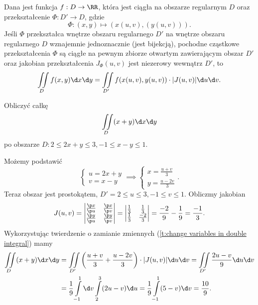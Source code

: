 \begin{theorem}
    \label{t:change variables in double integral}
    Dana jest funkcja $f : D \to \RR$, która jest ciągła na obszarze regularnym $D$ oraz przekształcenie $\varPhi : D' \to D$, gdzie
    \[ \varPhi : (x, y) \mapsto (x(u, v), (y(u, v))). \]
    Jeśli $\varPhi$ przekształca wnętrze obszaru regularnego $D'$ na wnętrze obszaru regularnego $D$ wznajemnie jednoznacznie (jest bijekcją), pochodne cząstkowe przekształcenia $\varPhi$ są ciągłe na pewnym zbiorze otwartym zawierającym obszar $D'$ oraz jakobian przekształcenia $J_\varPhi(u, v)$ jest niezerowy wewnątrz $D'$, to
    \[ \iint\limits_D f(x, y) \d x \d y = \iint\limits_{D'} f(x(u, v), y(u, v)) \cdot |J(u, v)| \d u \d v. \]
\end{theorem}

\begin{example}
    Obliczyć całkę
    \[ \iint\limits_D (x + y) \d x \d y \]
    po obszarze $D : 2 \leq 2x + y \leq 3, -1 \leq x - y \leq 1$.
\end{example}
\begin{solution}
    Możemy podstawić
    \[ \begin{cases} u = 2x + y \\ v = x - y \end{cases} \implies \begin{cases} x = \frac{u + v}{3} \\ y = \frac{u - 2v}{3} \end{cases}. \]
    Teraz obszar jest prostokątem, $D' = 2 \leq u \leq 3, -1 \leq v \leq 1$. Obliczmy jakobian
    \[ J(u, v) = \begin{vmatrix}
        \frac{\p x}{\p u} & \frac{\p x}{\p v} \\
        \frac{\p y}{\p u} & \frac{\p y}{\p v}
    \end{vmatrix} = \begin{vmatrix}
        \frac{1}{3} & \frac{1}{3} \\
        \frac{1}{3} & \frac{-2}{3}
    \end{vmatrix} = \frac{-2}{9} - \frac{1}{9} = \frac{-1}{3}. \]
    Wykorzystując twierdzenie o zamianie zmiennych (\ref{t:change variables in double integral}) mamy
    \begin{align*}
        \iint\limits_D (x + y) \d x \d y &= \iint\limits_{D'} \left(\frac{u + v}{3} + \frac{u - 2v}{3}\right) \cdot |J(u, v)| \d u \d v = \iint\limits_{D'} \frac{2u - v}{9} \d u \d v \\
        &= \frac{1}{9}\int\limits_{-1}^1 \d v \int\limits_2^3 (2u - v) \d u = \frac{1}{9}\int\limits_{-1}^1 (5 - v) \d v = \frac{10}{9}.
    \end{align*}
\end{solution}